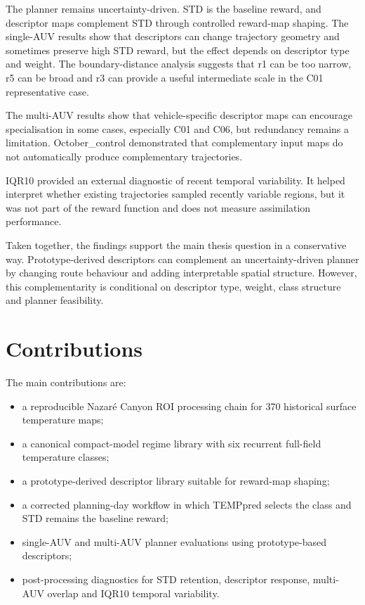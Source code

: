 The planner remains uncertainty-driven. STD is the baseline reward, and descriptor maps complement STD through controlled reward-map shaping. The single-AUV results show that descriptors can change trajectory geometry and sometimes preserve high STD reward, but the effect depends on descriptor type and weight. The boundary-distance analysis suggests that r1 can be too narrow, r5 can be broad and r3 can provide a useful intermediate scale in the C01 representative case.

The multi-AUV results show that vehicle-specific descriptor maps can encourage specialisation in some cases, especially C01 and C06, but redundancy remains a limitation. October\_control demonstrated that complementary input maps do not automatically produce complementary trajectories.

IQR10 provided an external diagnostic of recent temporal variability. It helped interpret whether existing trajectories sampled recently variable regions, but it was not part of the reward function and does not measure assimilation performance.

Taken together, the findings support the main thesis question in a conservative way. Prototype-derived descriptors can complement an uncertainty-driven planner by changing route behaviour and adding interpretable spatial structure. However, this complementarity is conditional on descriptor type, weight, class structure and planner feasibility.

\section{Contributions}

The main contributions are:

\begin{itemize}
    \item a reproducible Nazar\'e Canyon ROI processing chain for 370 historical surface temperature maps;
    \item a canonical compact-model regime library with six recurrent full-field temperature classes;
    \item a prototype-derived descriptor library suitable for reward-map shaping;
    \item a corrected planning-day workflow in which TEMPpred selects the class and STD remains the baseline reward;
    \item single-AUV and multi-AUV planner evaluations using prototype-based descriptors;
    \item post-processing diagnostics for STD retention, descriptor response, multi-AUV overlap and IQR10 temporal variability.
\end{itemize}


